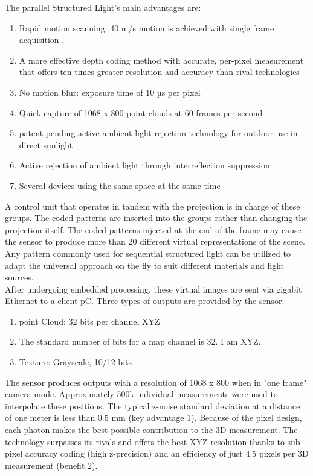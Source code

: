 \documentclass[12pt]{article}
\begin{document}
The parallel Structured Light's main advantages are:
\begin{enumerate}
 \item  Rapid motion scanning: 40 m/s motion is achieved with single frame acquisition \cite{ref15}.
\item A more effective depth coding method with accurate, per-pixel measurement that offers ten times greater resolution and accuracy than rival technologies\cite{ref15}
 \item No motion blur: exposure time of 10 µs per pixel\cite{ref15}
 \item Quick capture of 1068 x 800 point clouds at 60 frames per second\cite{ref15}
\item patent-pending active ambient light rejection technology for outdoor use in direct sunlight\cite{ref15}
 \item Active rejection of ambient light through interreflection suppression\cite{ref15}
\item Several devices using the same space at the same time\cite{ref15}\\
\end{enumerate}

A control unit that operates in tandem with the projection is in charge of these groups. The coded patterns are inserted into the groups rather than changing the projection itself. The coded patterns injected at the end of the frame may cause the sensor to produce more than 20 different virtual representations of the scene.  Any pattern commonly used for sequential structured light can be utilized to adapt the universal approach on the fly to suit different materials and light sources\cite{ref15}. \\

After undergoing embedded processing, these virtual images are sent via gigabit Ethernet to a client pC.  Three types of outputs are provided by the sensor: \cite{ref15}
\begin{enumerate}
    \item point Cloud: 32 bits per channel  XYZ \cite{ref15}
    \item The standard number of bits for a map channel is 32. I am XYZ.\cite{ref15}
    \item Texture: Grayscale, 10/12 bits \cite{ref15}
\end{enumerate}

The sensor produces outputs with a resolution of 1068 x 800 when in "one frame" camera mode.  Approximately 500k individual measurements were used to interpolate these positions. The typical z-noise standard deviation at a distance of one meter is less than 0.5 mm (key advantage 1).  Because of the pixel design, each photon makes the best possible contribution to the 3D measurement.  The technology surpasses its rivals and offers the best XYZ resolution thanks to sub-pixel accuracy coding (high z-precision) and an efficiency of just 4.5 pixels per 3D measurement (benefit 2)\cite{ref15}. \\
\end{document}
